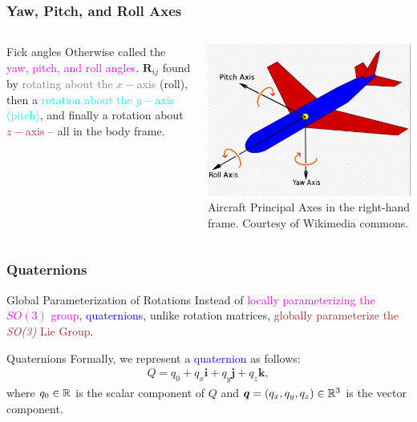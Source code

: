 \begin{frame}
	\frametitle{Yaw, Pitch, and Roll Axes}
	\begin{columns}[]
		\begin{column}{.45\linewidth}
			\begin{block}{Fick angles}
				Otherwise called the \textcolor{magenta}{yaw, pitch, and roll angles}. $\bm{R}_{ij}$ found by \textcolor{gray}{rotating about the $x-$axis}  (roll), then  a \textcolor{cyan}{rotation about the $y-$axis (pitch)}, and finally a rotation about \textcolor{brown}{$z-$axis} -- all in the body frame. 
			\end{block}
		\end{column}
		\begin{column}{.55\linewidth}
			\centering
			\includegraphics[width=\textwidth]{figures/yawpitchroll.jpg}
			\footnotesize{Aircraft Principal Axes in the right-hand frame. Courtesy of Wikimedia commons.}
		\end{column}
	\end{columns}
\end{frame}


\begin{frame}
	\frametitle{Quaternions}
	\begin{block}{Global Parameterization of Rotations}
		  Instead of \textcolor{magenta}{locally parameterizing the $SO(3)$ group}, \textcolor{blue}{quaternions}, unlike rotation matrices, \textcolor{brown}{globally parameterize the \textit{SO(3)} Lie Group}.
	\end{block}
	
	\begin{block}{Quaternions}
		Formally, we represent a \textcolor{blue}{quaternion} as follows:
		\begin{align}
			Q = q_0 + q_x \bm{i} + q_y \bm{j} + q_z \bm{k},
		\end{align}
		where $q_0 \in \mathbb{R}$ is the scalar component of $Q$ and $\bm{q} = (q_x, q_y, q_z) \in \mathbb{R}^3$ is the vector component.
	\end{block}
\end{frame}

